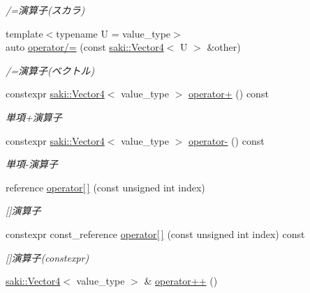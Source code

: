 \begin{DoxyCompactItemize}
\begin{DoxyCompactList}\small\item\em /=演算子(スカラ) \end{DoxyCompactList}\item 
{\footnotesize template$<$typename U  = value\+\_\+type$>$ }\\auto \mbox{\hyperlink{classsaki_1_1_vector4_a5007abd7277bf1a27bb6a9eb8e2eceb5}{operator/=}} (const \mbox{\hyperlink{classsaki_1_1_vector4}{saki\+::\+Vector4}}$<$ U $>$ \&other)
\begin{DoxyCompactList}\small\item\em /=演算子(ベクトル) \end{DoxyCompactList}\item 
constexpr \mbox{\hyperlink{classsaki_1_1_vector4}{saki\+::\+Vector4}}$<$ value\+\_\+type $>$ \mbox{\hyperlink{classsaki_1_1_vector4_a3983864f4c422dd7b0d88618acddf8d9}{operator+}} () const
\begin{DoxyCompactList}\small\item\em 単項+演算子 \end{DoxyCompactList}\item 
constexpr \mbox{\hyperlink{classsaki_1_1_vector4}{saki\+::\+Vector4}}$<$ value\+\_\+type $>$ \mbox{\hyperlink{classsaki_1_1_vector4_a23fdd521d8b4839844359bdf2e746a6a}{operator-\/}} () const
\begin{DoxyCompactList}\small\item\em 単項-\/演算子 \end{DoxyCompactList}\item 
reference \mbox{\hyperlink{classsaki_1_1_vector4_a7e5a60c77b2f5c2572fd106d8a0e1648}{operator\mbox{[}$\,$\mbox{]}}} (const unsigned int index)
\begin{DoxyCompactList}\small\item\em \mbox{[}\mbox{]}演算子 \end{DoxyCompactList}\item 
constexpr const\+\_\+reference \mbox{\hyperlink{classsaki_1_1_vector4_a1789c94309f025efd51511f33b539350}{operator\mbox{[}$\,$\mbox{]}}} (const unsigned int index) const
\begin{DoxyCompactList}\small\item\em \mbox{[}\mbox{]}演算子(constexpr) \end{DoxyCompactList}\item 
\mbox{\hyperlink{classsaki_1_1_vector4}{saki\+::\+Vector4}}$<$ value\+\_\+type $>$ \& \mbox{\hyperlink{classsaki_1_1_vector4_a132345ec0ca3c521a8b69dafcd63253a}{operator++}} ()

\end{DoxyCompactItemize}
